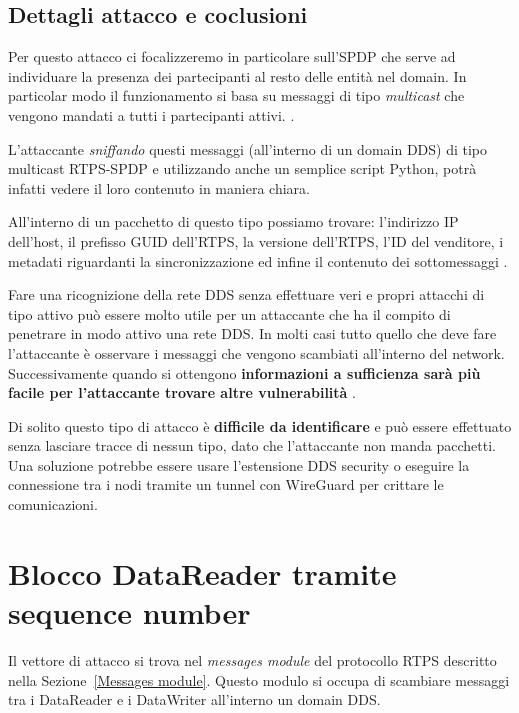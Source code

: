 \subsection{Dettagli attacco e coclusioni}
Per questo attacco ci focalizzeremo in particolare sull'SPDP che serve ad
individuare la presenza dei partecipanti al resto delle
entità nel domain. In particolar modo
il funzionamento si basa su messaggi di tipo \textit{multicast} che vengono
mandati a tutti i partecipanti attivi.
\cite{ddsrtps}.

L'attaccante \textit{sniffando} questi messaggi (all'interno di un domain DDS)
di tipo multicast RTPS-SPDP e
utilizzando anche un semplice script Python, potrà infatti 
vedere il loro contenuto in maniera chiara.

All'interno di un pacchetto di questo tipo possiamo trovare:
l'indirizzo IP dell'host, il prefisso GUID dell'RTPS,
la versione dell'RTPS, l'ID del venditore, i metadati 
riguardanti la sincronizzazione
ed infine il contenuto dei sottomessaggi \cite{White2017AnII}.


Fare una ricognizione della rete DDS senza effettuare veri e propri
attacchi di tipo attivo può essere molto utile per un attaccante che 
ha il compito di penetrare in modo attivo
una rete DDS. In molti casi tutto quello che deve fare l'attaccante
è osservare i messaggi che vengono scambiati all'interno del network.
Successivamente quando si ottengono \textbf{informazioni 
a sufficienza sarà più
facile per l'attaccante trovare altre vulnerabilità}
\cite{White2017AnII}.

Di solito questo tipo di attacco è \textbf{difficile da identificare} 
e può essere
effettuato senza lasciare tracce di nessun tipo, dato che l'attaccante non 
manda pacchetti.
Una soluzione potrebbe essere usare l'estensione DDS security o 
eseguire la connessione tra i nodi tramite un tunnel con WireGuard per crittare
le comunicazioni.



\section{Blocco DataReader tramite sequence number}

Il vettore di attacco si trova nel \textit{messages module} del protocollo RTPS
descritto nella Sezione~\ref{Messages module}. Questo modulo
si occupa di scambiare messaggi tra i DataReader e i DataWriter 
all'interno un domain DDS.

